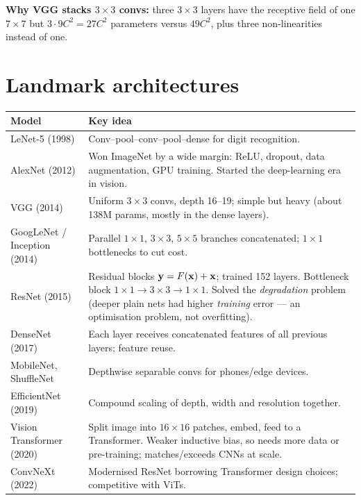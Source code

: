 \textbf{Why VGG stacks $3\times3$ convs:} three $3\times3$ layers have the receptive field of one $7\times7$ but $3\cdot9C^2=27C^2$ parameters versus $49C^2$, plus three non-linearities instead of one.

\section{Landmark architectures}
\begin{longtable}{@{}p{}p{}@{}}
\toprule
Model & Key idea\\
\midrule
LeNet-5 (1998) & Conv--pool--conv--pool--dense for digit recognition.\\
AlexNet (2012) & Won ImageNet by a wide margin: ReLU, dropout, data augmentation, GPU training. Started the deep-learning era in vision.\\
VGG (2014) & Uniform $3\times3$ convs, depth 16--19; simple but heavy (about 138M params, mostly in the dense layers).\\
GoogLeNet / Inception (2014) & Parallel $1\times1$, $3\times3$, $5\times5$ branches concatenated; $1\times1$ bottlenecks to cut cost.\\
ResNet (2015) & Residual blocks $\mathbf{y}=F(\mathbf{x})+\mathbf{x}$; trained 152 layers. Bottleneck block $1\times1\to3\times3\to1\times1$. Solved the \emph{degradation} problem (deeper plain nets had higher \emph{training} error --- an optimisation problem, not overfitting).\\
DenseNet (2017) & Each layer receives concatenated features of all previous layers; feature reuse.\\
MobileNet, ShuffleNet & Depthwise separable convs for phones/edge devices.\\
EfficientNet (2019) & Compound scaling of depth, width and resolution together.\\
Vision Transformer (2020) & Split image into $16\times16$ patches, embed, feed to a Transformer. Weaker inductive bias, so needs more data or pre-training; matches/exceeds CNNs at scale.\\
ConvNeXt (2022) & Modernised ResNet borrowing Transformer design choices; competitive with ViTs.\\
\bottomrule
\end{longtable}

